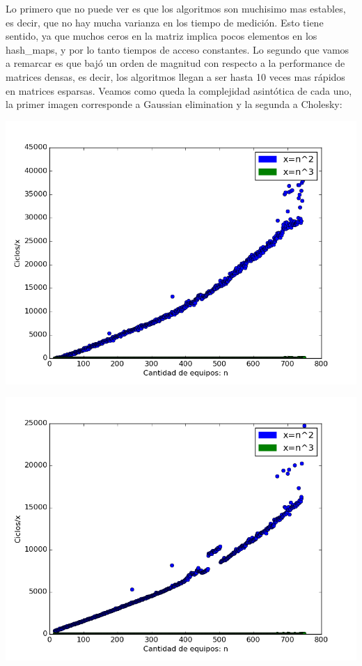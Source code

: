  Lo primero que no puede ver es que los algoritmos son muchisimo mas estables, es decir, que no hay mucha varianza en los tiempo de medición. Esto tiene sentido, ya que muchos ceros en la matriz implica pocos elementos en los hash_maps, y por lo tanto tiempos de acceso constantes. Lo segundo que vamos a remarcar es que bajó un orden de magnitud con respecto a la performance de matrices densas, es decir, los algoritmos llegan a ser hasta 10 veces mas rápidos en matrices esparsas. Veamos como queda la complejidad asintótica de cada uno, la primer imagen corresponde a Gaussian elimination y la segunda a Cholesky:
 
\includegraphics[scale=0.7]{img/complejidadfixedgaussian.png}
  
\includegraphics[scale=0.7]{img/complejidadfixedcholesky.png}

